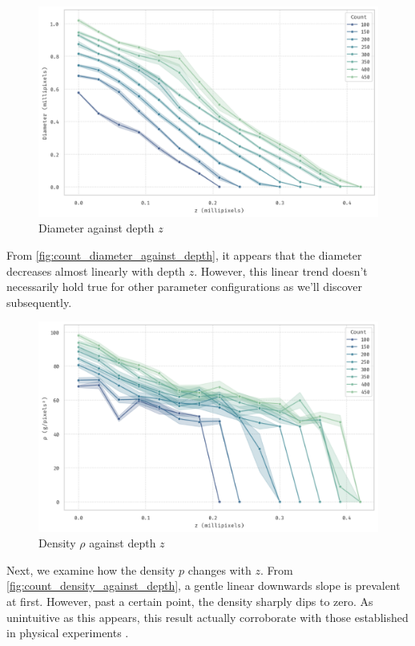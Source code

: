 \documentclass[a4paper,10pt]{article}
\begin{document}
\begin{multicols}{2}
    \begin{figure}[H]
        \centering
        \includegraphics[width=\linewidth]{bee_count_diameter.pdf}
        \caption{Diameter against depth $z$}
        \label{fig:count_diameter_against_depth}
    \end{figure}

    From \autoref{fig:count_diameter_against_depth}, it appears that the diameter decreases almost
    linearly with depth $z$. However, this linear trend doesn't necessarily hold true for
    other parameter configurations as we'll discover subsequently.

    \begin{figure}[H]
        \centering
        \includegraphics[width=\linewidth]{bee_count_density.pdf}
        \caption{Density $\rho$ against depth $z$}
        \label{fig:count_density_against_depth}
    \end{figure}

    Next, we examine how the density $p$ changes with $z$. From \autoref{fig:count_density_against_depth},
    a gentle linear downwards slope is prevalent at first. However, past a certain point, the density
    sharply dips to zero. As unintuitive as this appears, this result actually corroborate with
    those established in physical experiments \cite{shishkov2022strength}.


\end{multicols}
\end{document}
